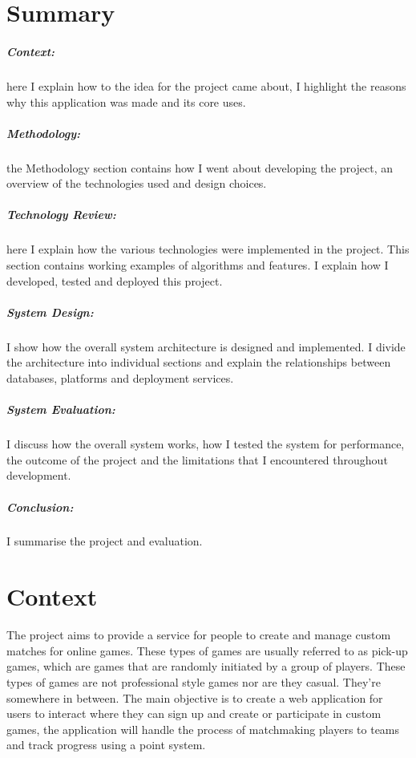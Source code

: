\chapter{Summary}
\paragraph{Context:} here I explain how to the idea for the project came about, I highlight the reasons why this application was made and its core uses.
\paragraph{Methodology:} the Methodology section contains how I went about developing the project, an overview of the technologies used and design choices.
\paragraph{Technology Review:} here I explain how the various technologies were implemented in the project. This section contains working examples of algorithms and features. I explain how I developed, tested and deployed this project.
\paragraph{System Design:} I show how the overall system architecture is designed and implemented. I divide the architecture into individual sections and explain the relationships between databases, platforms and deployment services.
\paragraph{System Evaluation:} I discuss how the overall system works, how I tested the system for performance, the outcome of the project and the limitations that I encountered throughout development.
\paragraph{Conclusion:} I summarise the project and evaluation.

\chapter{Context}
The project aims to provide a service for people to create and manage custom matches for online games. These types of games are usually referred to as pick-up games, which are games that are randomly initiated by a group of players. These types of games are not professional style games nor are they casual. They're somewhere in between. The main objective is to create a web application for users to interact where they can sign up and create or participate in custom games, the application will handle the process of matchmaking players to teams and track progress using a point system.
